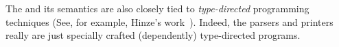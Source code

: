 
The \ddc{} and its semantics are also closely tied to 
{\em type-directed} programming techniques
(See, for example, Hinze's work~\cite{hinze:generic}).
Indeed, the \ddc{} parsers and printers really are just
specially crafted (dependently) type-directed programs.


